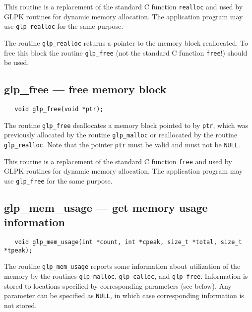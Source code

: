 This routine is a replacement of the standard C function \verb|realloc|
and used by GLPK routines for dynamic memory allocation. The
application program may use \verb|glp_realloc| for the same purpose.

\returns

The routine \verb|glp_realloc| returns a pointer to the memory block
reallocated. To free this block the routine \verb|glp_free| (not the
standard C function \verb|free|!) should be used.

\subsection{glp\_free --- free memory block}

\synopsis

\begin{verbatim}
   void glp_free(void *ptr);
\end{verbatim}

\description

The routine \verb|glp_free| deallocates a memory block pointed to by
\verb|ptr|, which was previously allocated by the routine
\verb|glp_malloc| or reallocated by the routine \verb|glp_realloc|.
Note that the pointer \verb|ptr| must be valid and must not be
\verb|NULL|.

This routine is a replacement of the standard C function \verb|free|
and used by GLPK routines for dynamic memory allocation. The
application program may use \verb|glp_free| for the same purpose.

\newpage

\subsection{glp\_mem\_usage --- get memory usage information}

\synopsis

\begin{verbatim}
   void glp_mem_usage(int *count, int *cpeak, size_t *total, size_t *tpeak);
\end{verbatim}

\description

The routine \verb|glp_mem_usage| reports some information about
utilization of the memory by the routines \verb|glp_malloc|,
\verb|glp_calloc|, and \verb|glp_free|. Information is stored to
locations specified by corresponding parameters (see below). Any
parameter can be specified as \verb|NULL|, in which case corresponding
information is not stored.

